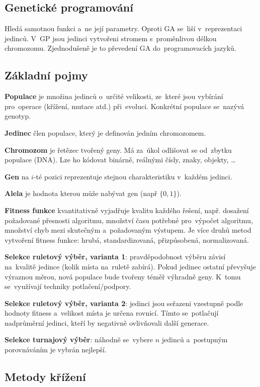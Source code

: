 \subsection{Genetické programování}

Hledá samotnou funkci a~ne její parametry. Oproti GA se~liší v~reprezentaci jedinců. V~GP jsou jedinci vytvořeni stromem s~proměnlivou délkou chromozomu. Zjednodušeně je to převedení GA do~programovacích jazyků.

\subsection{Základní pojmy}

\textbf{Populace} je množina jedinců o~určité velikosti, ze~které jsou vybírání pro~operace (křížení, mutace atd.) při~evoluci. Konkrétní populace se~nazývá genotyp.

\textbf{Jedinec} člen populace, který je definován jedním chromozomem.

\textbf{Chromozom} je řetězec tvořený geny. Má za~úkol odlišovat se od~zbytku populace (DNA). Lze ho kódovat binárně, reálnými čísly, znaky, objekty, \dots

\textbf{Gen} na $i$-té pozici reprezentuje stejnou charakteristiku v~každém jedinci.

\textbf{Alela} je hodnota kterou může nabývat gen (např $\{0, 1\}$).

\textbf{Fitness funkce} kvantitativně vyjadřuje kvalitu každého řešení, např. dosažení požadované přesnosti algoritmu, množství času potřebné pro~výpočet algoritmu, množství chyb mezi skutečným a~požadovaným výstupem. Je více druhů metod vytvoření fitness funkce: hrubá, standardizovaná, přizpůsobená, normalizovaná.

\textbf{Selekce ruletový výběr, varianta 1}: pravděpodobnost výběru závisí na~kvalitě jedince (kolik místa na~ruletě zabírá). Pokud jedinec ostatní převyšuje výraznou měrou, nová populace bude tvořeny téměř výhradně geny. K~tomu se~využívají techniky potlačení/podpory.

\textbf{Selekce ruletový výběr, varianta 2}: jedinci jsou seřazeni vzestupně podle hodnoty fitness a~velikost místa je určena rovnicí. Tímto se~potlačují nadprůměrní jedinci, kteří by negativně ovlivňovali další generace.

\textbf{Selekce turnajový výběr}: náhodně se~vybere $n$ jedinců a~postupným porovnáváním je vybrán nejlepší.

\subsection{Metody křížení}

